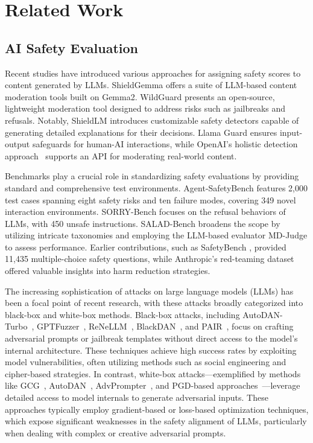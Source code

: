 \section{Related Work}
\subsection{AI Safety Evaluation}
Recent studies have introduced various approaches for assigning safety scores to content generated by LLMs. ShieldGemma \cite{zeng2024shieldgemma} offers a suite of LLM-based content moderation tools built on Gemma2. WildGuard \cite{han2024wildguard} presents an open-source, lightweight moderation tool designed to address risks such as jailbreaks and refusals. Notably, ShieldLM \cite{zhang2024shieldlm} introduces customizable safety detectors capable of generating detailed explanations for their decisions. Llama Guard \cite{inan2023llama} ensures input-output safeguards for human-AI interactions, while OpenAI’s holistic detection approach~\cite{markov2023holistic} supports an API for moderating real-world content.

Benchmarks play a crucial role in standardizing safety evaluations by providing standard and comprehensive test environments. Agent-SafetyBench \cite{zhang2024agent} features 2,000 test cases spanning eight safety risks and ten failure modes, covering 349 novel interaction environments. SORRY-Bench \cite{xie2024sorry} focuses on the refusal behaviors of LLMs, with 450 unsafe instructions. SALAD-Bench \cite{li2024salad} broadens the scope by utilizing intricate taxonomies and employing the LLM-based evaluator MD-Judge to assess performance. Earlier contributions, such as SafetyBench \cite{zhang2023safetybench}, provided 11,435 multiple-choice safety questions, while Anthropic’s red-teaming dataset~\cite{ganguli2022red} offered valuable insights into harm reduction strategies.

The increasing sophistication of attacks on large language models (LLMs) has been a focal point of recent research, with these attacks broadly categorized into black-box and white-box methods. Black-box attacks, including AutoDAN-Turbo~\cite{liu2024autodan}, GPTFuzzer~\cite{yu2023gptfuzzer}, ReNeLLM~\cite{ding2023wolf}, BlackDAN~\cite{wang2024blackdan}, and PAIR~\cite{chao2023jailbreaking}, focus on crafting adversarial prompts or jailbreak templates without direct access to the model's internal architecture. These techniques achieve high success rates by exploiting model vulnerabilities, often utilizing methods such as social engineering and cipher-based strategies.
In contrast, white-box attacks—exemplified by methods like GCG~\cite{DBLP:journals/corr/abs-2307-15043}, AutoDAN~\cite{liu2023autodan}, AdvPrompter~\cite{paulus2024advprompter}, and PGD-based approaches~\cite{wang2024blackdan, huang2024cross}—leverage detailed access to model internals to generate adversarial inputs. These approaches typically employ gradient-based or loss-based optimization techniques, which expose significant weaknesses in the safety alignment of LLMs, particularly when dealing with complex or creative adversarial prompts.

